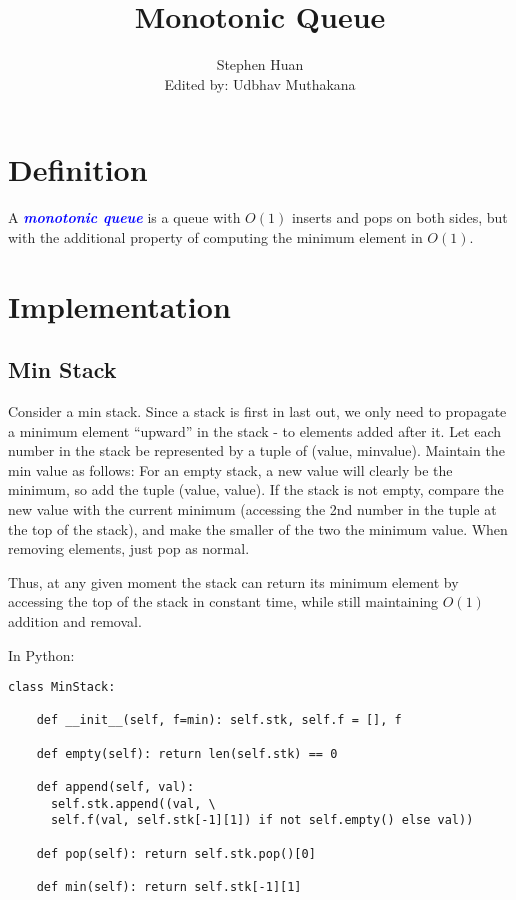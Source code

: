 \documentclass[11pt, oneside]{article}
\title{Monotonic Queue}
\author{Stephen Huan \\ Edited by: Udbhav Muthakana}
\newcommand{\emphasis}[1]{\textcolor{blue}{\textbf{\textit{#1}}}}
\begin{document}
\maketitle

\section{Definition}

A \emphasis{monotonic queue} is a queue with \( O(1) \) inserts and pops on both sides, but with the additional property of computing the minimum element in \( O(1) \).

\section{Implementation}
\subsection{Min Stack}

Consider a min stack. Since a stack is first in last out, we only need to propagate a minimum element
``upward'' in the stack - to elements added after it.
Let each number in the stack be represented by a tuple of (value, minvalue). Maintain the min value as follows:
For an empty stack, a new value will clearly be the minimum, so add the tuple (value, value).
If the stack is not empty, compare the new value with the current minimum (accessing the 2nd number in the tuple at the top of the stack), and make the smaller of the two the minimum value. When removing elements, just pop as normal.

Thus, at any given moment the stack can return its minimum element by accessing the top of the stack in constant time, while still maintaining \( O(1) \) addition and removal.

In Python:

\begin{verbatim}
class MinStack:

    def __init__(self, f=min): self.stk, self.f = [], f

    def empty(self): return len(self.stk) == 0

    def append(self, val):
      self.stk.append((val, \
      self.f(val, self.stk[-1][1]) if not self.empty() else val))

    def pop(self): return self.stk.pop()[0]

    def min(self): return self.stk[-1][1]
\end{verbatim}
\end{document}
